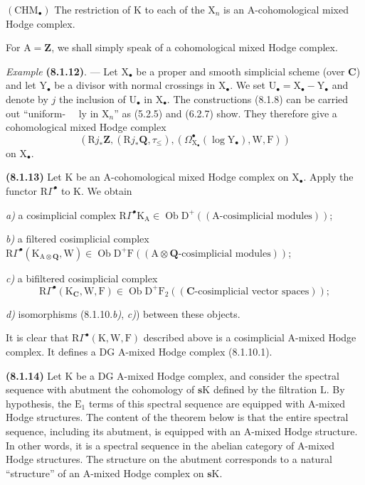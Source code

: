\documentclass[11pt,leqno]{article}
\newcommand{\Page}[1]{\ifvmode\noindent\else\unskip\ \fi{\footnotesize\textcolor{gray}{[p.\,#1]}}\ \ignorespaces}
\begin{document}
\((\mathrm{CHM}_{\bullet})\) The restriction of \(\mathrm{K}\) to each of the \(\mathrm{X}_{n}\) is an \(\mathrm{A}\)-cohomological mixed Hodge complex.

For \(\mathrm{A}=\mathbf{Z}\), we shall simply speak of a cohomological mixed Hodge complex.

\textit{Example} \textbf{(8.1.12)}. — Let \(\mathrm{X}_{\bullet}\) be a proper and smooth simplicial scheme (over \(\mathbf{C}\)) and let \(\mathrm{Y}_{\bullet}\) be a divisor with normal crossings in \(\mathrm{X}_{\bullet}\). We set \(\mathrm{U}_{\bullet}=\mathrm{X}_{\bullet}-\mathrm{Y}_{\bullet}\) and denote by \(j\) the inclusion of \(\mathrm{U}_{\bullet}\) in \(\mathrm{X}_{\bullet}\). The constructions (8.1.8) can be carried out “uniform-%
\Page{32}ly in \(\mathrm{X}_{n}\)” as (5.2.5) and (6.2.7) show. They therefore give a cohomological mixed Hodge complex
\[
(\mathrm{R}j_{\ast}\mathbf{Z},(\mathrm{R}j_{\ast}\mathbf{Q},\tau_{\leq}),
(\Omega_{\mathrm{X}_{\bullet}}^\bullet(\log\mathrm{Y}_{\bullet}),\mathrm{W},\mathrm{F}))
\]
on \(\mathrm{X}_{\bullet}\).

\textbf{(8.1.13)} Let \(\mathrm{K}\) be an \(\mathrm{A}\)-cohomological mixed Hodge complex on \(\mathrm{X}_{\bullet}\). Apply the functor \(\mathrm{R}\Gamma^\bullet\) to \(\mathrm{K}\). We obtain

\textit{a)} a cosimplicial complex \(\mathrm{R}\Gamma^\bullet\mathrm{K}_{\mathrm{A}}\in\operatorname{Ob}\mathrm{D}^{+}((\mathrm{A}\text{-cosimplicial modules}))\);

\textit{b)} a filtered cosimplicial complex \(\mathrm{R}\Gamma^\bullet(\mathrm{K}_{\mathrm{A}\otimes\mathbf{Q}},\mathrm{W})\in\operatorname{Ob}\mathrm{D}^{+}\mathrm{F}((\mathrm{A}\otimes\mathbf{Q}\text{-cosimplicial modules}))\);

\textit{c)} a bifiltered cosimplicial complex
\[
\mathrm{R}\Gamma^\bullet(\mathrm{K}_{\mathbf{C}},\mathrm{W},\mathrm{F})
\in\operatorname{Ob}\mathrm{D}^{+}\mathrm{F}_{2}((\mathbf{C}\text{-cosimplicial vector spaces}));
\]

\textit{d)} isomorphisms (8.1.10.\textit{b)}, \textit{c)}) between these objects.

It is clear that \(\mathrm{R}\Gamma^\bullet(\mathrm{K},\mathrm{W},\mathrm{F})\) described above is a cosimplicial \(\mathrm{A}\)-mixed Hodge complex. It defines a \(\mathrm{DG}\) \(\mathrm{A}\)-mixed Hodge complex (8.1.10.1).

\textbf{(8.1.14)} Let \(\mathrm{K}\) be a \(\mathrm{DG}\) \(\mathrm{A}\)-mixed Hodge complex, and consider the spectral sequence with abutment the cohomology of \(\mathbf{s}\mathrm{K}\) defined by the filtration \(\mathrm{L}\). By hypothesis, the \(\mathrm{E}_{1}\) terms of this spectral sequence are equipped with \(\mathrm{A}\)-mixed Hodge structures. The content of the theorem below is that the entire spectral sequence, including its abutment, is equipped with an \(\mathrm{A}\)-mixed Hodge structure. In other words, it is a spectral sequence in the abelian category of \(\mathrm{A}\)-mixed Hodge structures. The structure on the abutment corresponds to a natural “structure” of an \(\mathrm{A}\)-mixed Hodge complex on \(\mathbf{s}\mathrm{K}\).
\end{document}
